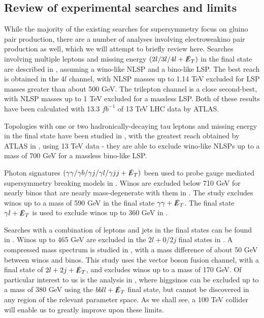 \subsection{Review of experimental searches and limits}

While the majority of the existing searches for supersymmetry focus on gluino pair production, there are a number of analyses involving electroweakino pair production as well, which we will attempt to briefly review here. 
Searches involving multiple leptons and missing energy $(2l/3l/4l +\slashed{E}_T)$ in the final state are described in \citep{ATLAS:2016uwq,ATLAS:2016soo,Khachatryan:2014qwa,Chatrchyan:2012pka}, assuming a wino-like NLSP and a bino-like LSP. The best reach is obtained in the $4l$ channel, with NLSP masses up to 1.14 TeV excluded for LSP masses greater than about 500 GeV. The trilepton channel is a close second-best, with NLSP masses up to 1 TeV excluded for a massless LSP. Both of these results have been calculated with 13.3 $fb^{-1}$ of 13 TeV LHC data by ATLAS. 

Topologies with one or two hadronically-decaying tau leptons and missing energy in the final state have been studied in \citep{ATLAS:2016ety,Khachatryan:2016trj}, with the greatest reach obtained by ATLAS in \citep{ATLAS:2016ety}, using 13 TeV data - they are able to exclude wino-like NLSPs up to a mass of 700 GeV for a massless bino-like LSP. 

Photon signatures $(\gamma\gamma/\gamma b/\gamma j/\gamma l/\gamma j j + \slashed{E}_T)$ been used to probe gauge mediated supersymmetry breaking  models in \citep{Chatrchyan:2012bba,CMS:2015loa,Aad:2015hea,Khachatryan:2015exa,Khachatryan:2016hns}. Winos are excluded below 710 GeV for nearly binos that are nearly mass-degenerate with them in \citep{Khachatryan:2016hns}. The study \cite{Aad:2015hea} excludes winos up to a mass of 590 GeV in the final state $\gamma\gamma + \slashed{E}_T$.  The final state $\gamma l + \slashed{E}_T$ is used to exclude winos up to 360 GeV in \citep{CMS:2015loa}. 

Searches with a combination of leptons and jets in the final states can be found in \citep{Aad:2014vma,Khachatryan:2015kxa,Khachatryan:2014mma}. Winos up to 465 GeV are excluded in the $2l + 0/2j$ final states in \citep{Aad:2014vma}. A compressed mass spectrum is studied in \citep{Khachatryan:2015kxa}, with a mass difference of about 50 GeV between winos and binos. This study uses the vector boson fusion channel, with a final state of $2l + 2j + \slashed{E}_T$, and excludes winos up to a mass of 170 GeV. Of particular interest to us is the analysis in \citep{Khachatryan:2014mma}, where higgsinos can be excluded up to a mass of 380 GeV using the $bbll + \slashed{E}_T$ final state, but cannot be discovered in any region of the relevant parameter space. As we shall see, a 100 TeV collider will enable us to greatly improve upon these limits.


